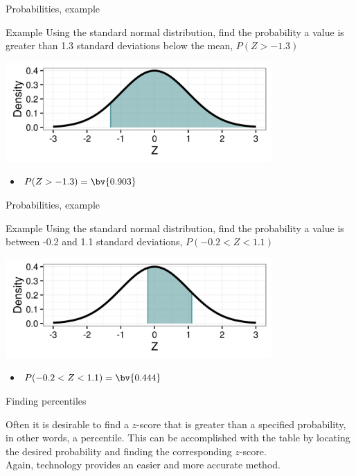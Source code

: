 \documentclass[xcolor=table, aspectratio=169, bigger, handout]{beamer}
\begin{document}
\begin{frame}{Probabilities, example}
\begin{exampleblock}{Example}
Using the standard normal distribution, find the probability a value is greater than 1.3 standard deviations below the mean, $P(Z > -1.3)$\\
\smallskip
{\centering
\includegraphics[width=4in]{../images/wk06_ex02}
\par}
\begin{itemize}
\pause\item $P(Z > -1.3) = \bv{0.903}$
\end{itemize}
\end{exampleblock}
\end{frame}

\begin{frame}{Probabilities, example}
\begin{exampleblock}{Example}
Using the standard normal distribution, find the probability a value is between -0.2 and 1.1 standard deviations, $P(-0.2 < Z < 1.1)$\\
\smallskip
{\centering
\includegraphics[width=4in]{../images/wk06_ex03}
\par}
\begin{itemize}
\pause\item $P(-0.2 < Z < 1.1) = \bv{0.444}$
\end{itemize}
\end{exampleblock}
\end{frame}

\begin{frame}{Finding percentiles}
\begin{block}{}
Often it is desirable to find a $z$-score that is greater than a specified probability, in other words, a percentile. This can be accomplished with the table by locating the desired probability and finding the corresponding $z$-score.\\
\medskip
Again, technology provides an easier and more accurate method.
\end{block}
\end{frame}
\end{document}
